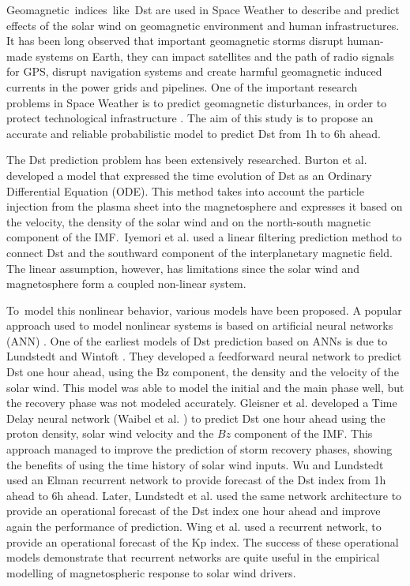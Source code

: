 Geomagnetic\ indices\ like\ Dst are used in Space Weather to describe and predict effects of the solar wind on 
geomagnetic environment and human infrastructures. It has been long observed that important geomagnetic storms 
disrupt human-made systems on Earth, they can impact satellites and the path of radio signals for GPS, 
disrupt navigation systems and create harmful geomagnetic induced currents in the power grids and pipelines. 
One of the important research problems in Space Weather is to predict geomagnetic disturbances, in order  
to protect technological infrastructure \citet{Singh2010}. The aim of this study is to propose an  accurate 
and reliable probabilistic model to predict Dst from 1h to 6h ahead. 

The Dst prediction problem has been extensively researched. Burton et al. \citet{JGR:JGR10260} developed a model 
that expressed the time evolution of Dst as an Ordinary Differential Equation (ODE). This method takes into account 
the particle injection from the plasma sheet into the magnetosphere and expresses it based on the velocity, 
the density of the solar wind and on the north-south magnetic component of the IMF.\ Iyemori et al. \citet{Iyemori1979} 
used a linear filtering prediction method to connect Dst and the southward component of the interplanetary 
magnetic field. The linear assumption, however, has limitations since  the solar wind and magnetosphere form a 
coupled non-linear system. 

To\ model this nonlinear behavior, various models have been proposed. A popular  approach used to model 
nonlinear systems is based on artificial neural networks (ANN) \citet{haykin1994neural}. One of the earliest models of 
Dst prediction based on ANNs is due to Lundstedt and Wintoft \citet{lundstedt1994prediction}. They developed a 
feedforward neural network to predict Dst one hour ahead, using the Bz component, the density and the velocity of 
the solar wind. This model was able to model the initial and the main phase well, but the recovery phase was not 
modeled accurately. Gleisner et al. \citet{gleisner1996predicting} developed a Time Delay neural network 
(Waibel et al. \citet{Waibel1989}) to predict Dst one hour ahead using the proton density, solar wind velocity and the  
\( Bz  \) component of the IMF. This approach managed to improve the prediction of storm recovery phases, 
showing the benefits of using the time history of solar wind inputs. Wu and Lundstedt \citet{wu1997geomagnetic} 
used an Elman recurrent network \citet{elman} to provide forecast of the Dst index from 1h ahead to 6h ahead. 
Later, Lundstedt et al. \citet{Lund} used the same network architecture to provide an operational forecast of 
the Dst index one hour ahead and improve again the performance of prediction. Wing et al. \citet{JGRA:JGRA17461} 
used a recurrent network, to provide an operational forecast of the Kp index. The success of these operational 
models demonstrate that recurrent networks are quite useful in the empirical modelling of magnetospheric 
response to solar wind drivers. 

